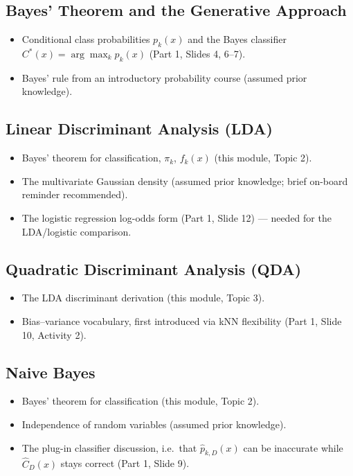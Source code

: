 \documentclass[11pt]{article}
\begin{document}
\subsection{Bayes' Theorem and the Generative Approach}
\begin{itemize}
\item Conditional class probabilities $p_k(x)$ and the Bayes classifier $C^*(x)=\arg\max_k p_k(x)$ (Part 1, Slides 4, 6--7).
\item Bayes' rule from an introductory probability course (assumed prior knowledge).
\end{itemize}

\subsection{Linear Discriminant Analysis (LDA)}
\begin{itemize}
\item Bayes' theorem for classification, $\pi_k$, $f_k(x)$ (this module, Topic 2).
\item The multivariate Gaussian density (assumed prior knowledge; brief on-board reminder recommended).
\item The logistic regression log-odds form (Part 1, Slide 12) --- needed for the LDA/logistic comparison.
\end{itemize}

\subsection{Quadratic Discriminant Analysis (QDA)}
\begin{itemize}
\item The LDA discriminant derivation (this module, Topic 3).
\item Bias--variance vocabulary, first introduced via kNN flexibility (Part 1, Slide 10, Activity 2).
\end{itemize}

\subsection{Naive Bayes}
\begin{itemize}
\item Bayes' theorem for classification (this module, Topic 2).
\item Independence of random variables (assumed prior knowledge).
\item The plug-in classifier discussion, i.e.\ that $\hat p_{k,D}(x)$ can be inaccurate while $\hat C_D(x)$ stays correct (Part 1, Slide 9).
\end{itemize}
\end{document}
